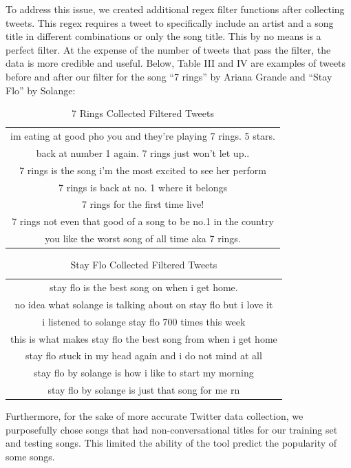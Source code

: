 \documentclass[12pt,conference]{IEEEtran}
\begin{document}
To address this issue, we created additional regex filter functions after collecting tweets. This regex requires a tweet to specifically include an artist and a song title in different combinations or only the song title. This by no means is a perfect filter. At the expense of the number of tweets that pass the filter, the data is more credible and useful. Below, Table III and IV are examples of tweets before and after our filter for the song ``7 rings'' by Ariana Grande and ``Stay Flo'' by Solange: 

\begin{table}[htb!]
 \centering
  \caption{7 Rings Collected Filtered Tweets}
{\begin{tabular}{c}
im eating at good pho you and they're playing 7 rings. 5 stars. \\
back at number 1 again. 7 rings just won't let up.. \\
7 rings is the song i’m the most excited to see her perform \\
7 rings is back at no. 1 where it belongs \\
7 rings for the first time live! \\
7 rings not even that good of a song to be no.1 in the country \\
you like the worst song of all time aka 7 rings. \\
\end{tabular}}
\end{table}

\begin{table}[htb!]
 \centering
  \caption{Stay Flo Collected Filtered Tweets}
{\begin{tabular}{c}
stay flo is the best song on when i get home. \\
no idea what solange is talking about on stay flo but i love it \\
i listened to solange stay flo 700 times this week \\
this is what makes stay flo the best song from when i get home \\
stay flo stuck in my head again and i do not mind at all \\
stay flo by solange is how i like to start my morning \\
stay flo by solange is just that song for me rn \\

\end{tabular}}
\end{table}

Furthermore, for the sake of more accurate Twitter data collection, we purposefully chose songs that had non-conversational titles for our training set and testing songs. This limited the ability of the tool predict the popularity of some songs. \par
\end{document}
